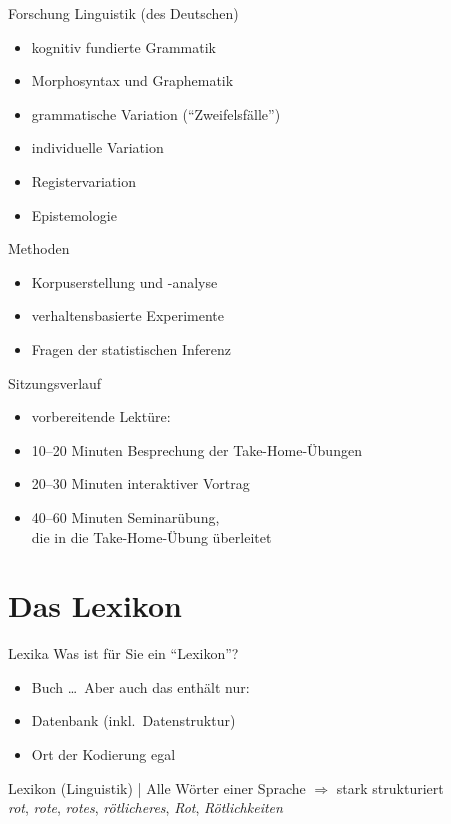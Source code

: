 \begin{frame}
  {Forschung}
  \onslide<+->
  \onslide<+->
  Linguistik (des Deutschen)\\
  \Halbzeile
  \begin{itemize}[<+->]
    \item kognitiv fundierte Grammatik
    \item Morphosyntax und Graphematik
    \item grammatische Variation ("`Zweifelsfälle"')
    \item individuelle Variation
    \item Registervariation
    \item Epistemologie
  \end{itemize}
  \Zeile
  \onslide<+->
  Methoden\\
  \Halbzeile
  \begin{itemize}[<+->]
    \item Korpuserstellung und -analyse
    \item verhaltensbasierte Experimente
    \item Fragen der statistischen Inferenz
  \end{itemize}
\end{frame}

\begin{frame}
  {Sitzungsverlauf}
  \onslide<+->
  \begin{itemize}[<+->]
    \item vorbereitende Lektüre: \citet{Schaefer2018b}
    \item 10--20 Minuten Besprechung der Take-Home-Übungen
    \item 20--30 Minuten interaktiver Vortrag
    \item 40--60 Minuten Seminarübung,\\
      die in die Take-Home-Übung überleitet
  \end{itemize}
\end{frame}

\section{Das Lexikon}

\begin{frame}
  {Lexika}
  \onslide<+->
  \onslide<+->
  Was ist für Sie ein "`Lexikon"'?\\
  \Zeile
  \onslide<+->
  \onslide<+->
  \begin{itemize}[<+->]
    \item Buch \onslide<+-> \ldots\ Aber auch das enthält nur:
    \item \alert{Datenbank} (inkl.\ Datenstruktur)
    \item Ort der Kodierung \alert{egal}
  \end{itemize}
  \onslide<+->
  \Zeile
  \alert{Lexikon (Linguistik) | Alle Wörter einer Sprache} \onslide<+-> \alert{$\Rightarrow$ stark strukturiert}\\
  \onslide<+->
  \textit{rot}, \textit{rote}, \textit{rotes}, \textit{rötlicheres}, \textit{Rot}, \textit{Rötlichkeiten}
\end{frame}

